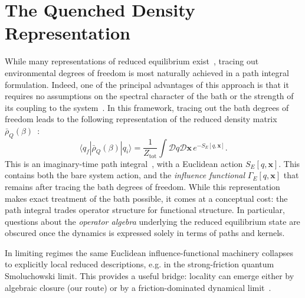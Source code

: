 \section{\label{sec:quenched}The Quenched Density Representation}


While many representations of reduced equilibrium exist~\cite{weissQuantumDissipativeSystems2012, breuerTheoryOpenQuantum2002, grabertQuantumBrownianMotion1988}, tracing out environmental degrees of freedom is most naturally achieved in a path integral formulation. Indeed, one of the principal advantages of this approach is that it requires no assumptions on the spectral character of the bath or the strength of its coupling to the system~\cite{weissQuantumDissipativeSystems2012}. In this framework, tracing out the bath degrees of freedom leads to the following representation of the reduced density matrix $\bar{\rho}_Q(\beta)$~\cite{feynmanQuantumMechanicsPath1965, kleinertPathIntegralsQuantum2009}:
\begin{equation}
    \langle q_f|\bar{\rho}_Q(\beta)|q_i\rangle = \frac{1}{Z_{\mathrm{tot}}} \int \mathcal{D}q \mathcal{D}\mathbf{x} \, e^{-S_E[q,\mathbf{x}]}.
\end{equation}
This is an imaginary-time path integral~\cite{feynmanQuantumMechanicsPath1965, kleinertPathIntegralsQuantum2009}, with a Euclidean action $S_E[q,\mathbf{x}]$. This contains both the bare system action, and the \emph{influence functional} $\Gamma_E[q,\mathbf{x}]$ that remains after tracing the bath degrees of freedom. While this representation makes exact treatment of the bath possible, it comes at a conceptual cost: the path
integral trades operator structure for functional structure. In particular,
questions about the \emph{operator algebra} underlying the reduced equilibrium
state are obscured once the dynamics is expressed solely in terms of paths and
kernels.

In limiting regimes the same Euclidean influence-functional machinery collapses to explicitly local reduced descriptions, e.g. in the strong-friction quantum Smoluchowski limit. This provides a useful bridge: locality can emerge either by algebraic closure (our route) or by a friction-dominated dynamical limit~\cite{AnkerholdPechukasGrabert2001}.

